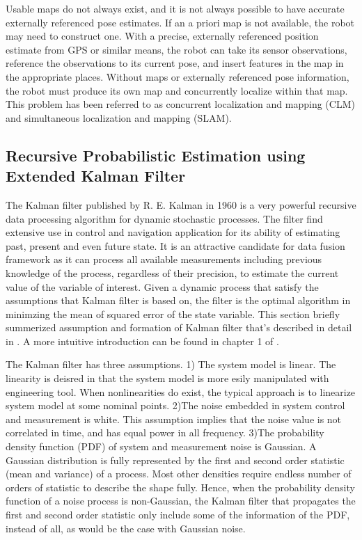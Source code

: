 Usable maps do not always exist, and it is not always possible to have 
accurate externally referenced pose estimates. If an a priori map is not 
available, the robot may need to construct one. With a precise, 
externally referenced position estimate from GPS or similar means, the 
robot can take its sensor observations, reference the observations to 
its current pose, and insert features in the map in the appropriate 
places. Without maps or externally referenced pose information, the 
robot must produce its own map and concurrently localize within that 
map. This problem has been referred to as concurrent localization and 
mapping (CLM) and simultaneous localization and mapping (SLAM).

\subsection{Recursive Probabilistic Estimation using Extended Kalman Filter}
\label{sec:SLAM_using_EKF}

The Kalman filter \cite{kalman_new_1960}published by R. E. Kalman in
1960 is a very powerful recursive data processing algorithm for
dynamic stochastic processes. The filter find extensive use in control
and navigation application for its ability of estimating past, present
and even future state. It is an attractive candidate for data fusion
framework as it can process all available measurements including
previous knowledge of the process, regardless of their precision, to
estimate the current value of the variable of interest. Given a
dynamic process that satisfy the assumptions that Kalman filter is
based on, the filter is the optimal algorithm in minimzing the mean of
squared error of the state variable. This section briefly summerized
assumption and formation of Kalman filter that's described in detail
in \cite{sorenson_least-squares_1970}
\cite{analytic_sciences_corporation_applied_1974}
\cite{grewal_kalman_1993} \cite{lewis_optimal_1986}
\cite{brown_introduction_1993}. A more intuitive introduction can be
found in chapter 1 of \cite{maybeck_stochastic_1979}.

The Kalman filter has three assumptions. 1) The system model is
linear. The linearity is deisred in that the system model is more
esily manipulated with engineering tool. When nonlinearities do exist,
the typical approach is to linearize system model at some nominal
points. 2)The noise embedded in system control and measurement is
white. This assumption implies that the noise value is not correlated
in time, and has equal power in all frequency. 3)The probability
density function (PDF) of system and measurement noise is Gaussian. A
Gaussian distribution is fully represented by the first and second
order statistic (mean and variance) of a process. Most other densities
require endless number of orders of statistic to describe the shape
fully. Hence, when the probability density function of a noise process
is non-Gaussian, the Kalman filter that propagates the first and
second order statistic only include some of the information of the
PDF, instead of all, as would be the case with Gaussian noise.

